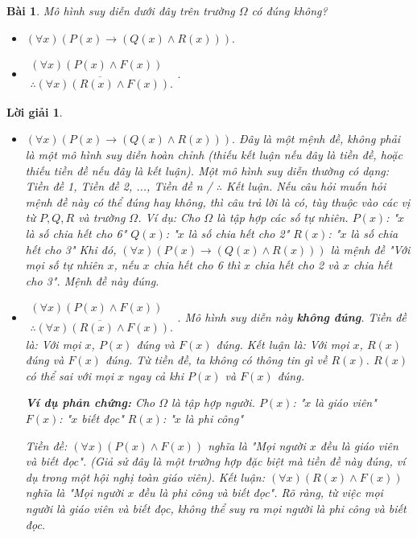 \documentclass[11pt, oneside, a4paper]{article}
\newtheorem{bt}{Bài}[section]
\newtheorem{loigiai}{Lời giải}[bt]
\begin{document}
    \begin{bt}
    Mô hình suy diễn dưới đây trên trường $\Omega$ có đúng không?
    \begin{itemize}
    \item[a)]$(\forall x) (P(x) \rightarrow (Q(x) \land R(x))).$
    \item[b)] $\begin{matrix}
         (\forall x) (P(x) \land F(x))\\
       \overline{\therefore (\forall x)(R(x) \land F(x))}.
    \end{matrix}.$
    \end{itemize}
    \end{bt}
    
    \begin{loigiai}
    \begin{itemize}
    \item[a)]$(\forall x) (P(x) \rightarrow (Q(x) \land R(x))).$
        Đây là một mệnh đề, không phải là một mô hình suy diễn hoàn chỉnh (thiếu kết luận nếu đây là tiền đề, hoặc thiếu tiền đề nếu đây là kết luận). Một mô hình suy diễn thường có dạng: Tiền đề 1, Tiền đề 2, ..., Tiền đề n / $\therefore$ Kết luận.
        Nếu câu hỏi muốn hỏi mệnh đề này có thể đúng hay không, thì câu trả lời là có, tùy thuộc vào các vị từ $P, Q, R$ và trường $\Omega$. Ví dụ:
        Cho $\Omega$ là tập hợp các số tự nhiên.
        $P(x)$: "$x$ là số chia hết cho 6"
        $Q(x)$: "$x$ là số chia hết cho 2"
        $R(x)$: "$x$ là số chia hết cho 3"
        Khi đó, $(\forall x) (P(x) \rightarrow (Q(x) \land R(x)))$ là mệnh đề "Với mọi số tự nhiên $x$, nếu $x$ chia hết cho 6 thì $x$ chia hết cho 2 và $x$ chia hết cho 3". Mệnh đề này đúng.
    
    \item[b)] $\begin{matrix}
         (\forall x) (P(x) \land F(x))\\
       \overline{\therefore (\forall x)(R(x) \land F(x))}.
    \end{matrix}.$
        Mô hình suy diễn này \textbf{không đúng}.
        Tiền đề là: Với mọi $x$, $P(x)$ đúng và $F(x)$ đúng.
        Kết luận là: Với mọi $x$, $R(x)$ đúng và $F(x)$ đúng.
        Từ tiền đề, ta không có thông tin gì về $R(x)$. $R(x)$ có thể sai với mọi $x$ ngay cả khi $P(x)$ và $F(x)$ đúng.
        
        \textbf{Ví dụ phản chứng:}
        Cho $\Omega$ là tập hợp người.
        $P(x)$: "$x$ là giáo viên"
        $F(x)$: "$x$ biết đọc"
        $R(x)$: "$x$ là phi công"
    
        Tiền đề: $(\forall x) (P(x) \land F(x))$ nghĩa là "Mọi người $x$ đều là giáo viên và biết đọc". (Giả sử đây là một trường hợp đặc biệt mà tiền đề này đúng, ví dụ trong một hội nghị toàn giáo viên).
        Kết luận: $(\forall x)(R(x) \land F(x))$ nghĩa là "Mọi người $x$ đều là phi công và biết đọc".
        Rõ ràng, từ việc mọi người là giáo viên và biết đọc, không thể suy ra mọi người là phi công và biết đọc.
    \end{itemize}
    \end{loigiai}
    
\end{document}

